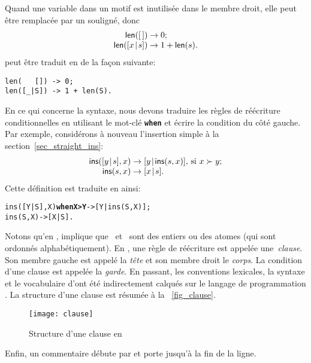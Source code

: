 Quand une variable dans un motif est inutilisée dans le membre droit,
elle peut être remplacée par un souligné, donc
\begin{equation*}
\begin{array}{@{}r@{\;}l@{\;}l@{}}
\fun{len}(\el)         & \rightarrow & 0;\\
\fun{len}(\cons{x}{s}) & \rightarrow & 1 + \fun{len}(s).
\end{array}
\end{equation*}
peut être traduit en \Erlang de la façon suivante:
\begin{verbatim}
len(   []) -> 0;
len([_|S]) -> 1 + len(S).
\end{verbatim}
En ce qui concerne la syntaxe, nous devons traduire les règles de
réécriture conditionnelles en utilisant le mot-clé
\texttt{\textbf{when}} et écrire la condition du côté gauche. Par
exemple, considérons à nouveau l'insertion simple à la
section~\ref{sec_straight_ins}:
\begin{equation*}
\begin{array}{@{}r@{\;}l@{\;}l@{}}
\fun{ins}(\cons{y}{s},x) & \rightarrow &
\cons{y}{\fun{ins}(s,x)}, \,\text{si \(x \succ y\)};\\
\fun{ins}(s,x) & \rightarrow & \cons{x}{s}.
\end{array}
\end{equation*}
Cette définition est traduite en \Erlang ainsi:
\begin{alltt}
ins([Y|S],X) \textbf{when X > Y} -> [Y|ins(S,X)];
ins(    S,X)            -> [X|S].
\end{alltt}
Notons qu'en \Erlang,  implique que
~et~ sont des entiers ou des atomes (qui sont
ordonnés alphabétiquement). En \Erlang, une règle de réécriture est
appelée une~\emph{clause}. Son membre gauche est appelé la \emph{tête}
et son membre droit le \emph{corps}. La condition d'une clause est
appelée la \emph{garde}. En passant, les conventions lexicales, la
syntaxe et le vocabulaire d'\Erlang ont été indirectement calqués sur
le langage de programmation \Prolog
\citep{SterlingShapiro_1994,Bratko_2000}. La structure d'une clause
\Erlang est résumée à la \fig~\vref{fig_clause}.
\begin{figure}[t]
\centering
\texttt{[image: clause]}
\caption{Structure d'une clause en \Erlang\label{fig_clause}}
\end{figure}

Enfin, un commentaire débute par \erlcode{\%} et porte jusqu'à la fin
de la ligne.

